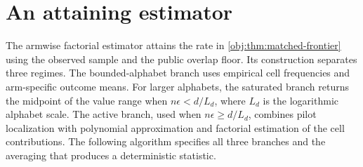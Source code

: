 \section{An attaining estimator}

The armwise factorial estimator  attains the rate in \cref{obj:thm:matched-frontier} using the observed sample and the public overlap floor. Its construction separates three regimes. The bounded-alphabet branch uses empirical cell frequencies and arm-specific outcome means. For larger alphabets, the saturated branch returns the midpoint of the value range when \(n\epsilon<d/L_d\), where \(L_d\) is the logarithmic alphabet scale. The active branch, used when \(n\epsilon\ge d/L_d\), combines pilot localization with polynomial approximation and factorial estimation of the cell contributions. The following algorithm specifies all three branches and the averaging that produces a deterministic statistic.

